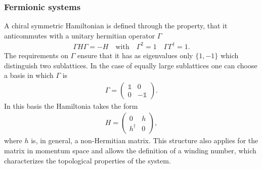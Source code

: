 \subsubsection{Fermionic systems}
A chiral symmetric Hamiltonian is defined through the property, that it anticommutes with a unitary hermitian operator $\Gamma$
\begin{align}
    \Gamma H \Gamma = -H \quad \text{with} \quad \Gamma^2 = 1\quad \Gamma\Gamma^\dagger=1.
\end{align}
The requirements on $\Gamma$ ensure that it has as eigenvalues only $\{1,-1\}$ which distinguish two sublattices. In the case of equally large sublattices one can choose a basis in which $\Gamma$ is
\begin{align}
    \Gamma = \begin{pmatrix}   
        \mathbb{1} & 0 \\
            0 & -\mathbb{1} 
    \end{pmatrix}.
\end{align}  
In this basis the Hamiltonia takes the form
\begin{align}\label{eq:block_off_Ham}
    H = \begin{pmatrix}
        0 & h \\
        h^\dagger & 0
    \end{pmatrix},
\end{align}
where $h$ is, in general, a non-Hermitian matrix. This structure also applies for the matrix in momentum space and allows the definition of a winding number, which characterizes the topological properties of the system. %
       

